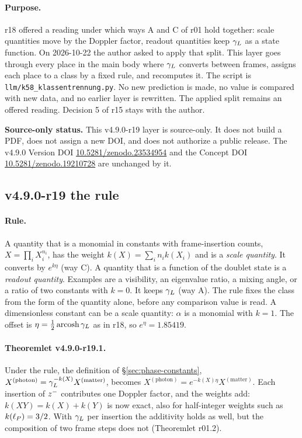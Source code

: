 \paragraph{Purpose.}
r18 offered a reading under which ways A and C of r01 hold together: scale quantities move by the Doppler factor, readout
quantities keep \(\gamma_L\) as a state function.  On 2026-10-22 the author asked to apply that split.  This layer goes through every
place in the main body where \(\gamma_L\) converts between frames, assigns each place to a class by a fixed rule, and recomputes it.
The script is \texttt{llm/k58\_klassentrennung.py}.  No new prediction is made, no value is compared with new data, and no
earlier layer is rewritten.  The applied split remains an offered reading.  Decision 5 of r15 stays with the author.

\noindent\textbf{Source-only status.}
This v4.9.0-r19 layer is source-only.  It does not build a PDF, does not assign a new DOI,
and does not authorize a public release.  The v4.9.0 Version DOI
\href{https://doi.org/10.5281/zenodo.23534954}{10.5281/zenodo.23534954} and the Concept DOI
\href{https://doi.org/10.5281/zenodo.19210728}{10.5281/zenodo.19210728} are unchanged by it.

\subsection*{v4.9.0-r19 the rule}
\label{subsec:v490-r19-rule}

\paragraph{Rule.}
A quantity that is a monomial in constants with frame-insertion counts, \(X=\prod_iX_i^{n_i}\), has the weight
\(k(X)=\sum_in_ik(X_i)\) and is a \emph{scale quantity}.  It converts by \(e^{k\eta}\) (way C).  A quantity that is a function of
the doublet state is a \emph{readout quantity}.  Examples are a visibility, an eigenvalue ratio, a mixing angle, or a ratio of
two constants with \(k=0\).  It keeps \(\gamma_L\) (way A).  The rule fixes the class from the form of the quantity alone, before any
comparison value is read.  A dimensionless constant can be a scale quantity: \(\alpha\) is a monomial with \(k=1\).  The offset is
\(\eta=\tfrac12\operatorname{arcosh}\gamma_L\) as in r18, so \(e^\eta=1.85419\).

\paragraph{Theoremlet v4.9.0-r19.1.}
Under the rule, the definition of \S\ref{sec:phase-constants}, \(X^{(\mathrm{photon})}=\gamma_L^{-k(X)}X^{(\mathrm{matter})}\), becomes
\(X^{(\mathrm{photon})}=e^{-k(X)\eta}X^{(\mathrm{matter})}\).  Each insertion of \(z^-\) contributes one Doppler factor, and the
weights add: \(k(XY)=k(X)+k(Y)\) is now exact, also for half-integer weights such as \(k(\ell_P)=3/2\).  With \(\gamma_L\) per insertion the
additivity holds as well, but the composition of two frame steps does not (Theoremlet r01.2).

